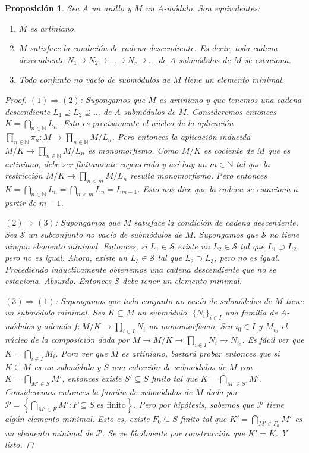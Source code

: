 \documentclass[12pt]{book}
\newtheorem{prop}[teo]{Proposición}
\theoremstyle{definition}
\newcommand{\NN}{\mathbb{N}}
\begin{document}
\begin{prop}
Sea $A$ un anillo y $M$ un $A$-módulo. Son equivalentes:
\begin{enumerate}
\item $M$ es artiniano.
\item $M$ satisface la condición de cadena descendiente. Es decir, toda cadena descendiente $N_1\supseteq N_2\supseteq\ldots \supseteq N_r\supseteq \ldots$ de $A$-submódulos de $M$ se estaciona.
\item Todo conjunto no vacío de submódulos de $M$ tiene un elemento minimal.
\end{enumerate}
\begin{proof}
$(1)\Longrightarrow (2)$: Supongamos que $M$ es artiniano y que tenemos una cadena descendiente $L_1\supseteq L_2\supseteq\ldots$ de $A$-submódulos de $M$. Consideremos entonces $K=\displaystyle\bigcap_{n\in\mathbb{N}}L_n$. Esto es precisamente el núcleo de la aplicación $\displaystyle\prod_{n\in\mathbb{N}}\pi_n : M\to\displaystyle\prod_{n\in\NN}M/L_n$. Pero entonces la aplicación inducida $M/K\to\displaystyle \prod_{n\in\NN}M/L_n$ es monomorfismo. Como $M/K$ es cociente de $M$ que es artiniano, debe ser finitamente cogenerado y así hay un $m\in\NN$ tal que la restricción $M/K\to \displaystyle\prod_{n<m}M/L_n$ resulta monomorfismo. Pero entonces $K=\displaystyle\bigcap_{n\in\NN}L_n = \displaystyle\bigcap_{n<m}L_n = L_{m-1}$. Esto nos dice que la cadena se estaciona a partir de $m-1$.

$(2)\Longrightarrow (3)$: Supongamos que $M$ satisface la condición de cadena descendente. Sea $\mathcal{S}$ un subconjunto no vacío de submódulos de $M$. Supongamos que $\mathcal{S}$ no tiene ningun elemento minimal. Entonces, si $L_1\in\mathcal{S}$ existe un $L_2\in \mathcal{S}$ tal que $L_1\supset L_2$, pero no es igual. Ahora, existe un $L_3\in\mathcal{S}$ tal que $L_2\supset L_3$, pero no es igual. Procediendo inductivamente obtenemos una cadena descendiente que no se estaciona. Absurdo. Entonces $\mathcal{S}$ debe tener un elemento minimal.

$(3)\Longrightarrow (1)$: Supongamos que todo conjunto no vacío de submódulos de $M$ tiene un submódulo minimal. Sea $K\subseteq M$ un submódulo, $\{N_i\}_{i\in I}$ una familia de $A$-módulos y además $f:M/K\to \displaystyle\prod_{i\in I}N_i$ un monomorfismo. Sea $i_0\in I$ y $M_{i_0}$ el núcleo de la composición dada por $M\longrightarrow M/K\longrightarrow \displaystyle\prod_{i\in I}N_i \longrightarrow N_{i_0}$. Es fácil ver que $K=\displaystyle\bigcap_{i\in I}M_i$. Para ver que $M$ es artiniano, bastará probar entonces que si $K\subseteq M$ es un submódulo y $S$ una colección de submódulos de $M$ con $K=\displaystyle\bigcap_{M'\in S}M'$, entonces existe $S'\subseteq S$ finito tal que $K=\displaystyle\bigcap_{M'\in S'}M'$. Consideremos entonces la familia de submódulos de $M$ dada por $\mathcal{P}=\left\{ \displaystyle\bigcap_{M'\in F}M' : F\subseteq S \text{ es finito}\right\}$. Pero por hipótesis, sabemos que $\mathcal{P}$ tiene algún elemento minimal. Esto es, existe $F_0\subseteq S$ finito tal que $K' = \displaystyle\bigcap_{M'\in F_0}M'$ es un elemento minimal de $\mathcal{P}$. Se ve fácilmente por construcción que $K'=K$. Y listo.
 

\end{proof}
\end{prop}
\end{document}
